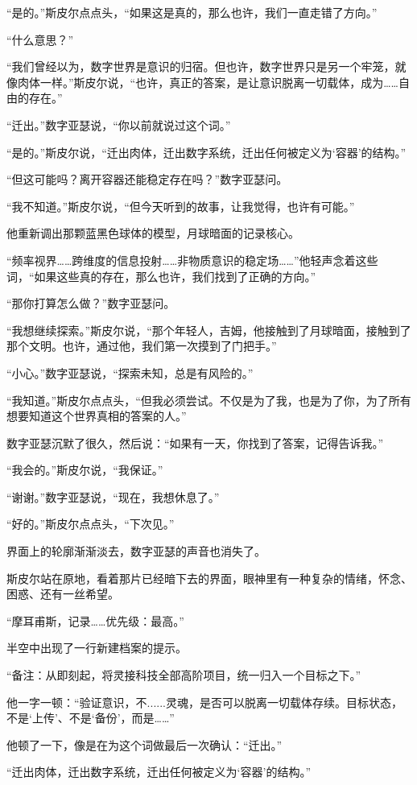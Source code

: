 “是的。”斯皮尔点点头，“如果这是真的，那么也许，我们一直走错了方向。”

“什么意思？”

“我们曾经以为，数字世界是意识的归宿。但也许，数字世界只是另一个牢笼，就像肉体一样。”斯皮尔说，“也许，真正的答案，是让意识脱离一切载体，成为……自由的存在。”

“迁出。”数字亚瑟说，“你以前就说过这个词。”

“是的。”斯皮尔说，“迁出肉体，迁出数字系统，迁出任何被定义为‘容器’的结构。”

“但这可能吗？离开容器还能稳定存在吗？”数字亚瑟问。

“我不知道。”斯皮尔说，“但今天听到的故事，让我觉得，也许有可能。”

他重新调出那颗蓝黑色球体的模型，月球暗面的记录核心。

“频率视界……跨维度的信息投射……非物质意识的稳定场……”他轻声念着这些词，“如果这些真的存在，那么也许，我们找到了正确的方向。”

“那你打算怎么做？”数字亚瑟问。

“我想继续探索。”斯皮尔说，“那个年轻人，吉姆，他接触到了月球暗面，接触到了那个文明。也许，通过他，我们第一次摸到了门把手。”

“小心。”数字亚瑟说，“探索未知，总是有风险的。”

“我知道。”斯皮尔点点头，“但我必须尝试。不仅是为了我，也是为了你，为了所有想要知道这个世界真相的答案的人。”

数字亚瑟沉默了很久，然后说：“如果有一天，你找到了答案，记得告诉我。”

“我会的。”斯皮尔说，“我保证。”

“谢谢。”数字亚瑟说，“现在，我想休息了。”

“好的。”斯皮尔点点头，“下次见。”

界面上的轮廓渐渐淡去，数字亚瑟的声音也消失了。

斯皮尔站在原地，看着那片已经暗下去的界面，眼神里有一种复杂的情绪，怀念、困惑、还有一丝希望。

“摩耳甫斯，记录……优先级：最高。”

半空中出现了一行新建档案的提示。

“备注：从即刻起，将灵接科技全部高阶项目，统一归入一个目标之下。”

他一字一顿：“验证意识，不......灵魂，是否可以脱离一切载体存续。目标状态，不是‘上传’、不是‘备份’，而是……”

他顿了一下，像是在为这个词做最后一次确认：“迁出。”

“迁出肉体，迁出数字系统，迁出任何被定义为‘容器’的结构。”

